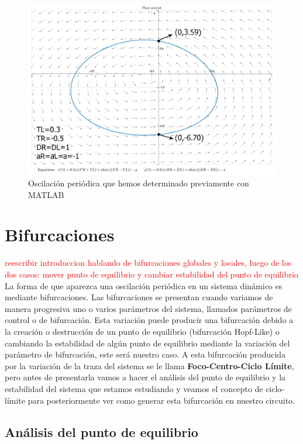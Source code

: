 \documentclass[12pt,a4paper]{report} %
\begin{document}
	\begin{figure}[h]
		\centering
		\includegraphics[width=1\textwidth]{clejemplo.jpg}
		\caption{Oscilación periódica que hemos determinado previamente con MATLAB}
		\label{fig:clejemplo}
	\end{figure}\smallskip
	
	\newpage
	
	\chapter{Bifurcaciones}
	\label{cap.5}
	\textcolor{red}{reescribir introduccion hablando de bifurcaciones globales y locales, luego de los dos casos: mover punto de equilibrio y cambiar estabilidad del punto de equilibrio}
	La forma de que aparezca una oscilación periódica en un sistema dinámico es mediante bifurcaciones. Las bifurcaciones se presentan cuando variamos de manera progresiva uno o varios parámetros del sistema, llamados parámetros de control o de bifurcación. Esta variación puede producir una bifurcación debido a la creación o destrucción de un punto de equilibrio (bifurcación Hopf-Like) o cambiando la estabilidad de algún punto de equilibrio mediante la variación del parámetro de bifurcación, este será nuestro caso. A esta bifurcación producida por la variación de la traza del sistema se le llama \textbf{Foco-Centro-Ciclo Límite}, pero antes de presentarla vamos a hacer el análisis del punto de equilibrio y la estabilidad del sistema que estamos estudiando y veamos el concepto de ciclo-límite para posteriormente ver como generar esta bifurcación en nuestro circuito.
	
	\newpage
	
	\section{Análisis del punto de equilibrio}
	
\end{document}
